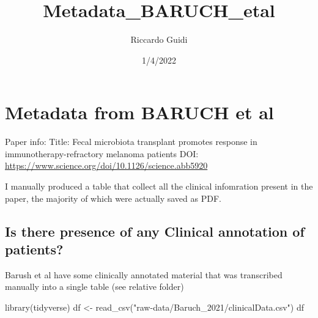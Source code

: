 \documentclass[
]{article}
\title{Metadata\_BARUCH\_etal}
\author{Riccardo Guidi}
\date{1/4/2022}
\newenvironment{Shaded}{\begin{snugshade}}{\end{snugshade}}
\newcommand{\FunctionTok}[1]{\textcolor[rgb]{0.00,0.00,0.00}{#1}}
\newcommand{\NormalTok}[1]{#1}
\newcommand{\OtherTok}[1]{\textcolor[rgb]{0.56,0.35,0.01}{#1}}
\newcommand{\StringTok}[1]{\textcolor[rgb]{0.31,0.60,0.02}{#1}}
\begin{document}
\maketitle

\hypertarget{metadata-from-baruch-et-al}{%
\section{Metadata from BARUCH et al}\label{metadata-from-baruch-et-al}}

Paper info: Title: Fecal microbiota transplant promotes response in
immunotherapy-refractory melanoma patients DOI:
\url{https://www.science.org/doi/10.1126/science.abb5920}

I manually produced a table that collect all the clinical infomration
present in the paper, the majority of which were actually saved as PDF.

\hypertarget{is-there-presence-of-any-clinical-annotation-of-patients}{%
\subsection{Is there presence of any Clinical annotation of
patients?}\label{is-there-presence-of-any-clinical-annotation-of-patients}}

Barush et al have some clinically annotated material that was
transcribed manually into a single table (see relative folder)

\begin{Shaded}
\begin{Highlighting}[]
\FunctionTok{library}\NormalTok{(tidyverse)}
\NormalTok{df }\OtherTok{\textless{}{-}} \FunctionTok{read\_csv}\NormalTok{(}\StringTok{"raw{-}data/Baruch\_2021/clinicalData.csv"}\NormalTok{)}
\NormalTok{df}
\end{Highlighting}
\end{Shaded}
\end{document}
